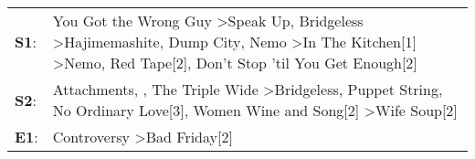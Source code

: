 \begin{supertabular}{p{0.03\textwidth}p{0.92\textwidth}}
 \textbf{S1}:  &  You Got the Wrong Guy\textsuperscript{} \textgreater \enspace Speak Up\textsuperscript{}, \enspace Bridgeless\textsuperscript{} \textgreater \enspace Hajimemashite\textsuperscript{}, \enspace Dump City\textsuperscript{}, \enspace Nemo\textsuperscript{} \textgreater \enspace In The Kitchen[1]\textsuperscript{} \textgreater \enspace Nemo\textsuperscript{}, \enspace Red Tape[2]\textsuperscript{}, \enspace Don't Stop 'til You Get Enough[2]\textsuperscript{}  \enspace  \\
 \textbf{S2}:  &                                                                                                            Attachments\textsuperscript{}, \textsuperscript{}, \enspace The Triple Wide\textsuperscript{} \textgreater \enspace Bridgeless\textsuperscript{}, \enspace Puppet String\textsuperscript{}, \enspace No Ordinary Love[3]\textsuperscript{}, \enspace Women Wine and Song[2]\textsuperscript{} \textgreater \enspace Wife Soup[2]\textsuperscript{}  \enspace  \\
 \textbf{E1}:  &                                                                                                                                                                                                                                                                                                                                                                                        Controversy\textsuperscript{} \textgreater \enspace Bad Friday[2]\textsuperscript{}  \enspace  \\
\end{supertabular}
